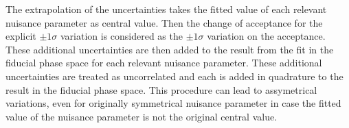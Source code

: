 The extrapolation of the uncertainties takes the fitted value of each relevant nuisance parameter as central value. Then the change of acceptance for the explicit $\pm 1 \sigma$ variation is considered as the $\pm 1 \sigma$ variation on the acceptance. These additional uncertainties are then added to the result from the fit in the fiducial phase space for each relevant nuisance parameter. These additional uncertainties are treated as uncorrelated and each is added in quadrature to the result in the fiducial phase space. This procedure can lead to assymetrical variations, even for originally symmetrical nuisance parameter in case the fitted value of the nuisance parameter is not the original central value.





